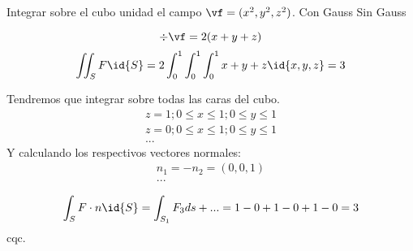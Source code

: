\begin{problem}[27]
Integrar sobre el cubo unidad el campo $\vf = (x^2,y^2,z^2)$.
\ppart Con Gauss
\ppart Sin Gauss
\solution

\spart
\[\div\vf = 2(x+y+z)\]
\[\iint_S F\id{S} = 2\int_0^1\int_0^1\int_0^1 x+y+z\id{x,y,z} = 3\]


\spart
Tendremos que integrar sobre todas las caras del cubo.
\begin{gather*}
z=1;0\leq x\leq 1; 0\leq y\leq 1\\
z=0;0\leq x\leq 1; 0\leq y\leq 1\\
...
\end{gather*}
Y calculando los respectivos vectores normales:
\begin{gather*}
n_1=-n_2=(0,0,1)\\
...
\end{gather*}

\[\int_S F\cdot n \id{S} = \int_{S_1} F_3ds + ... = 1-0+1-0+1-0=3\]
cqc.

\end{problem}
